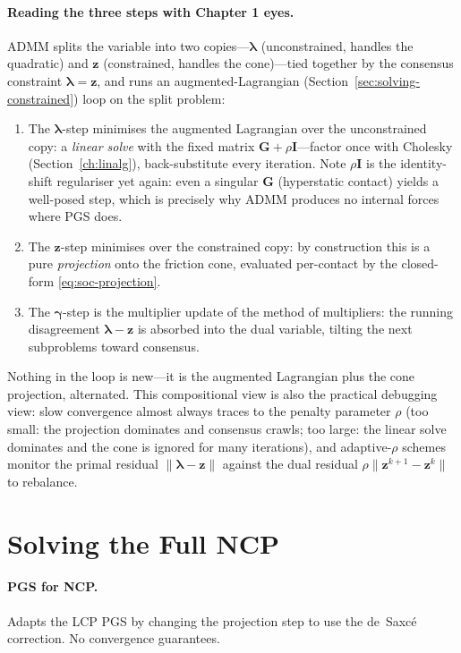 \documentclass[11pt,twoside]{report}
\theoremstyle{definition}
\theoremstyle{plain}
\theoremstyle{remark}
\newcommand{\0}{\bm{0}}
\newcommand{\I}{\bm{I}}
\begin{document}
\paragraph{Reading the three steps with Chapter 1 eyes.}
ADMM splits the variable into two copies---$\bm{\lambda}$
(unconstrained, handles the quadratic) and $\bm{z}$ (constrained,
handles the cone)---tied together by the consensus constraint
$\bm{\lambda}=\bm{z}$, and runs an augmented-Lagrangian
(Section~\ref{sec:solving-constrained}) loop on the split problem:
\begin{enumerate}
\item The $\bm{\lambda}$-step minimises the augmented Lagrangian over
      the unconstrained copy: a \emph{linear solve} with the fixed
      matrix $\bm{G}+\rho\I$---factor once with Cholesky
      (Section~\ref{ch:linalg}), back-substitute every iteration.
      Note $\rho\I$ is the identity-shift regulariser yet again:
      even a singular $\bm{G}$ (hyperstatic contact) yields a
      well-posed step, which is precisely why ADMM produces no
      internal forces where PGS does.
\item The $\bm{z}$-step minimises over the constrained copy: by
      construction this is a pure \emph{projection} onto the friction
      cone, evaluated per-contact by the closed-form
      \eqref{eq:soc-projection}.
\item The $\bm{\gamma}$-step is the multiplier update of the method of
      multipliers: the running disagreement
      $\bm{\lambda}-\bm{z}$ is absorbed into the dual variable, tilting
      the next subproblems toward consensus.
\end{enumerate}
Nothing in the loop is new---it is the augmented Lagrangian plus the
cone projection, alternated. This compositional view is also the
practical debugging view: slow convergence almost always traces to the
penalty parameter $\rho$ (too small: the projection dominates and
consensus crawls; too large: the linear solve dominates and the cone is
ignored for many iterations), and adaptive-$\rho$ schemes monitor the
primal residual $\|\bm{\lambda}-\bm{z}\|$ against the dual residual
$\rho\|\bm{z}^{k+1}-\bm{z}^{k}\|$ to rebalance.

\section{Solving the Full NCP}

\paragraph{PGS for NCP.}
Adapts the LCP PGS by changing the projection step to use the
de~Saxc\'e correction.  No convergence guarantees.
\end{document}
